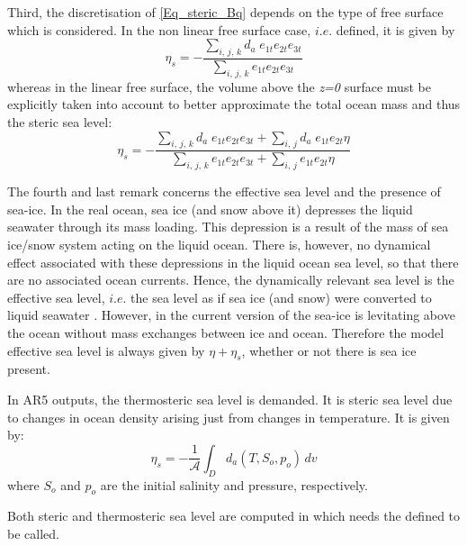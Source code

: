 Third, the discretisation of \eqref{Eq_steric_Bq} depends on the type of free surface
which is considered. In the non linear free surface case, $i.e.$  defined, it is
given by
\begin{equation}  \label{Eq_discrete_steric_Bq}
   \eta_s =  - \frac{ \sum_{i,\,j,\,k} d_a\; e_{1t} e_{2t} e_{3t} }
   					{ \sum_{i,\,j,\,k}         e_{1t} e_{2t} e_{3t} } 
\end{equation}
whereas in the linear free surface, the volume above the \textit{z=0} surface must be explicitly taken 
into account to better approximate the total ocean mass and thus the steric sea level:
\begin{equation}  \label{Eq_discrete_steric_Bq}
   \eta_s =  - \frac{ \sum_{i,\,j,\,k} d_a\; e_{1t}e_{2t}e_{3t} + \sum_{i,\,j} d_a\; e_{1t}e_{2t} \eta }
   						{\sum_{i,\,j,\,k} e_{1t}e_{2t}e_{3t} + \sum_{i,\,j}           e_{1t}e_{2t} \eta } 
\end{equation}

The fourth and last remark concerns the effective sea level and the presence of sea-ice.
In the real ocean, sea ice (and snow above it)  depresses the liquid seawater through 
its mass loading. This depression is a result of the mass of sea ice/snow system acting 
on the liquid ocean. There is, however, no dynamical effect associated with these depressions 
in the liquid ocean sea level, so that there are no associated ocean currents. Hence, the 
dynamically relevant sea level is the effective sea level, $i.e.$ the sea level as if sea ice 
(and snow) were converted to liquid seawater \citep{Campin_al_OM08}. However,
in the current version of \NEMO the sea-ice is levitating above the ocean without 
mass exchanges between ice and ocean. Therefore the model effective sea level
is always given by $\eta + \eta_s$, whether or not there is sea ice present.

In AR5 outputs, the thermosteric sea level is demanded. It is steric sea level due to 
changes in ocean density arising just from changes in temperature. It is given by:
\begin{equation}  \label{Eq_thermosteric_Bq}
   \eta_s = - \frac{1}{\mathcal{A}} \int_D d_a(T,S_o,p_o) \,dv
\end{equation}
where $S_o$ and $p_o$ are the initial salinity and pressure, respectively.

Both steric and thermosteric sea level are computed in  which needs
the  defined to be called.













